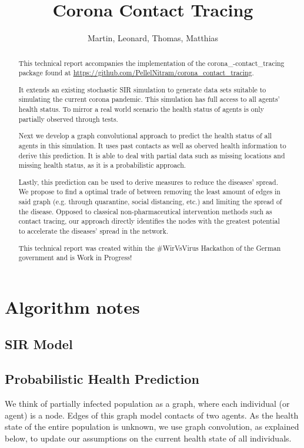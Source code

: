 \documentclass[]{article}
\title{Corona Contact Tracing}
\author{Martin, Leonard, Thomas, Matthias}
\begin{document}
\maketitle

\begin{abstract}
	This technical report accompanies the implementation of the corona\_-contact\_tracing package found at \url{https://github.com/PellelNitram/corona_contact_tracing}.

	It extends an existing stochastic SIR simulation to generate data sets suitable to simulating the current corona pandemic.
	This simulation has full access to all agents' health status.
	To mirror a real world scenario the health status of agents is only partially observed through tests.

	Next we develop a graph convolutional approach to predict the health status of all agents in this simulation.
	It uses past contacts as well as oberved health information to derive this prediction.
	It is able to deal with partial data such as missing locations and missing health status, as it is a probabilistic approach.
	
	Lastly, this prediction can be used to derive measures to reduce the diseases' spread.
	We propose to find a optimal trade of between removing the least amount of edges in said graph (e.g. through quarantine, social distancing, etc.) and limiting the spread of the disease.
	Opposed to classical non-pharmaceutical intervention methods such as contact tracing, our approach directly identifies the nodes with the greatest potential to accelerate the diseases' spread in the network.
	
	This technical report was created within the \#WirVsVirus Hackathon of the German government and is Work in Progress!
\end{abstract}

\section{Algorithm notes}

\subsection{SIR Model}

\subsection{Probabilistic Health Prediction}
We think of partially infected population as a graph, where each individual (or agent) is a node.
Edges of this graph model contacts of two agents.
As the health state of the entire population is unknown, we use graph convolution, as explained below, to update our assumptions on the current health state of all individuals.
\end{document}
